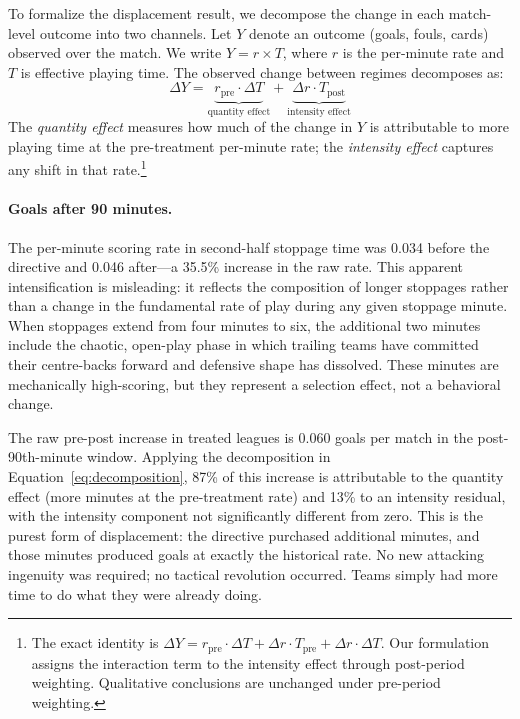To formalize the displacement result, we decompose the change in each match-level outcome into two channels. Let $Y$ denote an outcome (goals, fouls, cards) observed over the match. We write $Y = r \times T$, where $r$ is the per-minute rate and $T$ is effective playing time. The observed change between regimes decomposes as:
\begin{equation}
\label{eq:decomposition}
    \Delta Y = \underbrace{r_{\text{pre}} \cdot \Delta T}_{\text{quantity effect}} + \underbrace{\Delta r \cdot T_{\text{post}}}_{\text{intensity effect}}
\end{equation}
The \emph{quantity effect} measures how much of the change in $Y$ is attributable to more playing time at the pre-treatment per-minute rate; the \emph{intensity effect} captures any shift in that rate.\footnote{The exact identity is $\Delta Y = r_{\text{pre}} \cdot \Delta T + \Delta r \cdot T_{\text{pre}} + \Delta r \cdot \Delta T$. Our formulation assigns the interaction term to the intensity effect through post-period weighting. Qualitative conclusions are unchanged under pre-period weighting.}

\paragraph{Goals after 90 minutes.} The per-minute scoring rate in second-half stoppage time was 0.034 before the directive and 0.046 after---a 35.5\% increase in the raw rate. This apparent intensification is misleading: it reflects the composition of longer stoppages rather than a change in the fundamental rate of play during any given stoppage minute. When stoppages extend from four minutes to six, the additional two minutes include the chaotic, open-play phase in which trailing teams have committed their centre-backs forward and defensive shape has dissolved. These minutes are mechanically high-scoring, but they represent a selection effect, not a behavioral change.

The raw pre-post increase in treated leagues is 0.060 goals per match in the post-90th-minute window. Applying the decomposition in Equation~\ref{eq:decomposition}, 87\% of this increase is attributable to the quantity effect (more minutes at the pre-treatment rate) and 13\% to an intensity residual, with the intensity component not significantly different from zero. This is the purest form of displacement: the directive purchased additional minutes, and those minutes produced goals at exactly the historical rate. No new attacking ingenuity was required; no tactical revolution occurred. Teams simply had more time to do what they were already doing.

